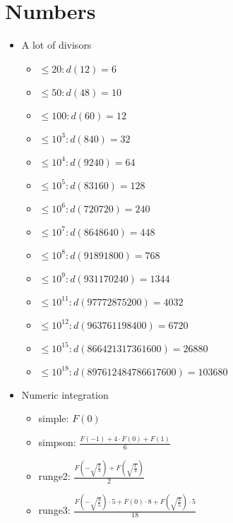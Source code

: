 \section{Numbers}

\begin{itemize}
	\item A lot of divisors
	\begin{itemize}
		\item $\leq 20: d(12)=6$
		\item $\leq 50: d(48)=10$
		\item $\leq 100: d(60)=12$
		\item $\leq 10^3: d(840)=32$
		\item $\leq 10^4: d(9240)=64$
		\item $\leq 10^5: d(83160)=128$
		\item $\leq 10^6: d(720720)=240$
		\item $\leq 10^7: d(8648640)=448$
		\item $\leq 10^8: d(91891800)=768$
		\item $\leq 10^9: d(931170240)=1344$
		\item $\leq 10^{11}: d(97772875200)=4032$
		\item $\leq 10^{12}: d(963761198400)=6720$
		\item $\leq 10^{15}: d(866421317361600)=26880$
		\item $\leq 10^{18}: d(897612484786617600)=103680$
	\end{itemize}

	\item Numeric integration
	\begin{itemize}
		\item simple: $F(0)$
		\item simpson: $\frac{F(-1) + 4 \cdot F(0) + F(1)}{6}$
		\item runge2: $\frac{ F(-\sqrt{\frac{1}{3}}) + F(\sqrt{\frac{1}{3}}) }{2}$
		\item runge3: $\frac{ F(-\sqrt{\frac{3}{5}}) \cdot 5 + F(0) \cdot 8 +  F(\sqrt{\frac{3}{5}}) \cdot 5}{18}$
	\end{itemize}
\end{itemize}	
